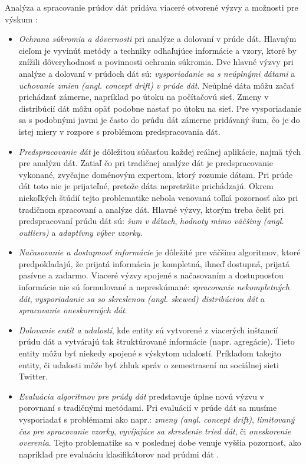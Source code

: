 Analýza a spracovanie prúdov dát pridáva viaceré otvorené výzvy a možnosti pre výskum \citep{krempl2014open}:
\begin{itemize}
	\item \textit{Ochrana súkromia a dôvernosti} pri analýze a dolovaní v prúde dát. Hlavným cieľom je vyvinúť metódy a techniky odhaľujúce informácie a vzory, ktoré by znížili dôveryhodnosť a povinnosti ochrania súkromia. Dve hlavné výzvy pri analýze a dolovaní v prúdoch dát sú: \textit{vysporiadanie sa s neúplnými dátami} a \textit{uchovanie zmien (angl. concept drift) v prúde dát}. Neúplné dáta môžu začať prichádzať zámerne, napríklad po útoku na počítačovú sieť. Zmeny v distribúcií dát môžu opäť podobne nastať po útoku na sieť. Pre vysporiadanie sa s podobnými javmi je často do prúdu dát zámerne pridávaný šum, čo je do istej miery v rozpore s problémom predspracovania dát.
	\item \textit{Predspracovanie dát} je dôležitou súčasťou každej reálnej aplikácie, najmä tých pre analýzu dát. Zatiaľ čo pri tradičnej analýze dát je predspracovanie vykonané, zvyčajne doménovým expertom, ktorý rozumie dátam. Pri prúde dát toto nie je prijateľné, pretože dáta nepretržite prichádzajú. Okrem niekoľkých štúdií \citep{zliobaite2014adaptive, anagnostopoulos2008deciding} tejto problematike nebola venovaná toľká pozornosť ako pri tradičnom spracovaní a analýze dát. Hlavné výzvy, ktorým treba čeliť pri predspracovaní prúdu dát sú: \textit{šum v dátach}, \textit{hodnoty mimo väčšiny (angl. outliers)} a \textit{adaptívny výber vzorky}.
	\item \textit{Načasovanie a dostupnosť informácie} je dôležité pre väčšinu algoritmov, ktoré predpokladajú, že prijatá informácia je kompletná, ihneď dostupná, prijatá pasívne a zadarmo. Viaceré výzvy spojené s načasovaním a dostupnosťou informácie nie sú formulované a nepreskúmané: \textit{spracovanie nekompletných dát}, \textit{vysporiadanie sa so skreslenou (angl. skewed) distribúciou dát} a \textit{spracovanie oneskorených dát}.
	\item \textit{Dolovanie entít a udalostí}, kde entity sú vytvorené z viacerých inštancií prúdu dát a vytvárajú tak štruktúrované informácie (napr. agregácie). Tieto entity môžu byť niekedy spojené s výskytom udalostí. Príkladom takejto entity, či udalosti môže byť zhluk správ o zemestrasení na sociálnej sieti Twitter. 
	\item \textit{Evaluácia algoritmov pre prúdy dát} predstavuje úplne novú výzvu v porovnaní s tradičnými metódami. Pri evaluácií v prúde dát sa musíme vysporiadať s problémami ako napr.: \textit{zmeny (angl. concept drift)}, \textit{limitovaný čas pre spracovanie vzorky}, \textit{vyvíjajúce sa skreslenie tried dát}, či \textit{oneskorenie overenia}. Tejto problematike sa v poslednej dobe venuje vyššia pozornosť, ako napríklad pre evaluáciu klasifikátorov nad prúdmi dát \citep{bifet2015efficient}.

\end{itemize}
